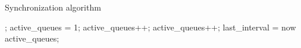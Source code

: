 \begin{algorithm}[h]
    \caption{Synchronization algorithm}\label{alg:algo}
\begin{algorithmic}[1]
    \State {};
\EndIf
\State active\_queues = 1;
    \State active\_queues++;
    \State active\_queues++;
    \EndIf
\EndFor
\State last\_interval = now
\State \Return active\_queues;
\EndProcedure
\end{algorithmic}
\end{algorithm}
